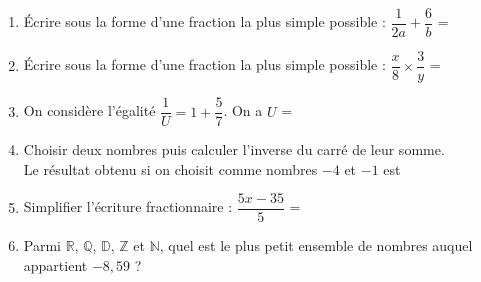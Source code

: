 \documentclass[a4paper,11pt]{article}
\begin{document}
\newpage
\vspace*{1cm}
\begin{seance}{} %

\begin{enumerate}
\item Écrire sous la forme d'une fraction la plus simple possible : $\dfrac{1}{2a}+\dfrac{6}{b}$ = \dotfill

\item Écrire sous la forme d'une fraction la plus simple possible : $\dfrac{x}{8}\times \dfrac{3}{y}$ = \dotfill

\item On considère l'égalité $\dfrac{1}{U}=1+\dfrac{5}{7}$. On a $U$ = \dotfill

\item Choisir deux nombres puis calculer l'inverse du carré de leur somme. \\ Le résultat obtenu si on choisit comme nombres $-4$ et $-1$ est \dotfill

\item Simplifier l'écriture fractionnaire : $\dfrac{5x-35}{5}$ = \dotfill

\item Parmi $\mathbb{R}$, $\mathbb{Q}$, $\mathbb{D}$, $\mathbb{Z}$ et $\mathbb{N}$, quel est le plus petit ensemble de nombres auquel appartient $-8{,}59$ ?

\dotfill
\end{enumerate}

\end{seance}
\end{document}
